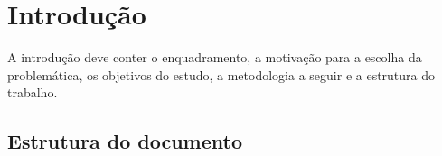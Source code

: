 \chapter*{Introdução}

A introdução deve conter o enquadramento, a motivação para a escolha da
problemática, os objetivos do estudo, a metodologia a seguir e a estrutura do
trabalho.

\section{Estrutura do documento}

\lipsum[1]
